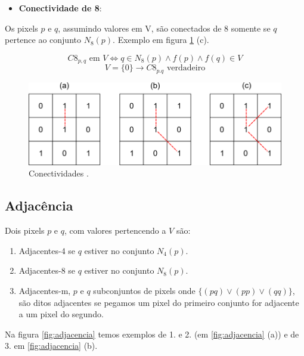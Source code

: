 \documentclass[
  brazilian,
]{book}
\providecommand{\tightlist}{%
  \setlength{\itemsep}{0pt}\setlength{\parskip}{0pt}}
\begin{document}
\begin{itemize}
\tightlist
\item
  \textbf{Conectividade de 8}:
\end{itemize}

Os pixels \(p\) e \(q\), assumindo valores em V, são conectados de 8 somente se \(q\) pertence ao conjunto \(N_8(p)\). Exemplo em figura \ref{fig:conectividade} (c).

\[C8_{p,q} \text{ em } V\Leftrightarrow q \in N_8(p) \wedge f(p) \wedge f(q) \in V \]
\[V = \{0\} \to C8_{p.q}\text{ verdadeiro}\]



\begin{figure}

{\centering \includegraphics[width=0.55\linewidth]{imagens/02-formacao/conectividade} 

}

\caption{Conectividades \autocite{thome2017}.}\label{fig:conectividade}
\end{figure}

\hypertarget{adjacuxeancia}{%
\subsection{Adjacência}\label{adjacuxeancia}}

Dois pixels \(p\) e \(q\), com valores pertencendo a \(V\) são:

\begin{enumerate}
\def\labelenumi{\arabic{enumi}.}
\tightlist
\item
  Adjacentes-4 se \(q\) estiver no conjunto \(N_4(p)\).
\item
  Adjacentes-8 se \(q\) estiver no conjunto \(N_8(p)\).
\item
  Adjacentes-m, \(p\) e \(q\) subconjuntos de pixels onde \(\{(pq) \vee (pp) \vee (q q) \}\), são ditos adjacentes se pegamos um pixel do primeiro conjunto for adjacente a um pixel do segundo.
\end{enumerate}

Na figura \ref{fig:adjacencia} temos exemplos de 1. e 2. (em \ref{fig:adjacencia} (a)) e de 3. em \ref{fig:adjacencia} (b).
\end{document}

